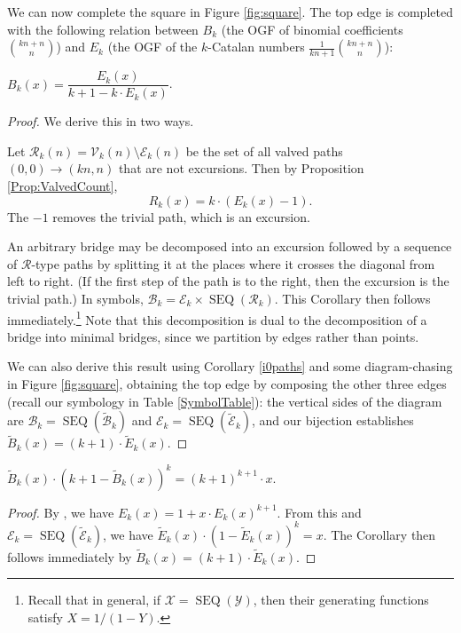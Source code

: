\documentclass[10pt]{article}
\newcommand{\eqn}[1]{\begin{equation*} #1 \end{equation*}}
\newcommand{\seq}[0]{\operatorname{SEQ}}
\begin{document}
We can now complete the square in Figure \ref{fig:square}.  The top edge is completed with the following relation between $B_k$ (the OGF of binomial coefficients $\binom{kn+n}{n}$) and $E_k$ (the OGF of the $k$-Catalan numbers $\frac{1}{kn+1}\binom{kn+n}{n}$): 
\begin{corollary} \label{ben3}
$B_k(x)=\dfrac{E_k(x)}{k+1-k\cdot E_k(x)}$.
\end{corollary}
\begin{proof}
We derive this in two ways.

Let $\mathcal{R}_k(n) = \mathcal{V}_k(n) \setminus \mathcal{E}_k(n)$ be the set of all valved paths $(0,0) \rightarrow (kn,n)$ that are not excursions.  Then by Proposition \ref{Prop:ValvedCount},
\eqn{R_k(x) = k \cdot (E_k(x) - 1).}
The $-1$ removes the trivial path, which is an excursion.

An arbitrary bridge may be decomposed into an excursion followed by a sequence of $\mathcal{R}$-type paths by splitting it at the places where it crosses the diagonal from left to right.  (If the first step of the path is to the right, then the excursion is the trivial path.)  In symbols, $\mathcal{B}_k = \mathcal{E}_k \times \seq(\mathcal{R}_k)$.  This Corollary then follows immediately.\footnote{Recall that in general, if $\mathcal{X}=\seq(\mathcal{Y})$, then their generating functions satisfy $X=1/(1-Y)$.} Note that this decomposition is dual to the decomposition of a bridge into minimal bridges, since we partition by edges rather than points.

We can also derive this result using Corollary \ref{i0paths} and some diagram-chasing in Figure \ref{fig:square}, obtaining the top edge by composing the other three edges (recall our symbology in Table \ref{SymbolTable}): the vertical sides of the diagram are $\mathcal{B}_k = \seq(\widetilde{\mathcal{B}}_k)$ and $\mathcal{E}_k = \seq(\widetilde{\mathcal{E}}_k)$, and our bijection establishes $\widetilde{B}_k(x) = (k+1) \cdot \widetilde{E}_k(x)$.
\end{proof}

\begin{corollary} \label{ben1}
$\widetilde{B}_k(x) \cdot (k+1-\widetilde{B}_k(x))^k = (k+1)^{k+1} \cdot x$.
\end{corollary}
\begin{proof}
By \cite[Theorem 10.4.5, second proof]{encylatt}, we have
$E_k(x) = 1 + x \cdot E_k(x)^{k+1}$. From this and $\mathcal{E}_k = \seq(\widetilde{\mathcal{E}}_k)$, we have $\widetilde{E}_k(x) \cdot (1 - \widetilde{E}_k(x))^k = x$.  The Corollary then follows immediately by $\widetilde{B}_k(x) = (k+1) \cdot \widetilde{E}_k(x)$.
\end{proof}
\end{document}
